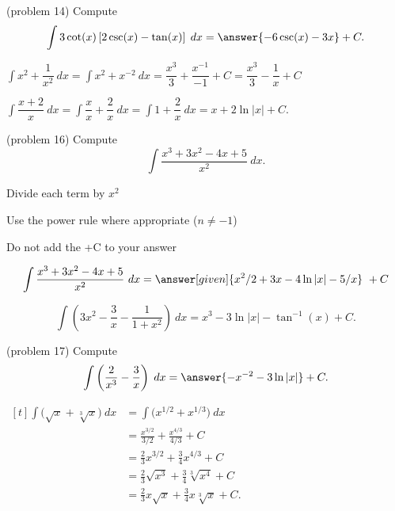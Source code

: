 \documentclass{ximera}
\begin{document}
\begin{problem}(problem 14)
Compute
\[
\int 3\cot(x)\left[2\csc(x) - \tan(x)\right]\; dx = \answer{-6\csc(x) - 3x} + C.
\]
\end{problem}



\begin{example}[example 15]
$\int x^2 + \dfrac{1}{x^2} \ dx = \int x^2 + x^{-2} \ dx = \dfrac{x^3}{3} + \dfrac{x^{-1}}{-1} + C 
= \dfrac{x^3}{3} - \dfrac{1}{x} + C$
\end{example}


\begin{example}[example 16]
$\int \dfrac{x+2}{x} \ dx = \int \dfrac{x}{x} + \dfrac{2}{x} \ dx = \int 1 + \dfrac{2}{x} \ dx = x + 2\ln|x| +C.$
\end{example}


\begin{problem}(problem 16)
Compute
\[
\int \dfrac{x^3 + 3x^2 - 4x + 5}{x^2} \ dx.
\]

\begin{hint}
Divide each term by $x^2$
\end{hint}
\begin{hint}
Use the power rule where appropriate ($n\neq -1$)
\end{hint}
\begin{hint}
\begin{center}
Do not add the +C to your answer
\end{center}
\end{hint}

\[
\int  \dfrac{x^3 + 3x^2 - 4x + 5}{x^2} \ dx =
\answer[given]{x^2 /2 + 3x - 4\ln|x| -5/x} \ +  C
\]
\end{problem}



\begin{example}[example 17]
\[
\int \left(3x^2 - \dfrac{3}{x} - \dfrac{1}{1+x^2}\right) \ dx = x^3 - 3\ln|x| - \tan^{-1}(x) + C.
\]
\end{example}


\begin{problem}(problem 17)
Compute
\[
\int \left(\frac{2}{x^3} - \frac{3}{x} \right) \; dx = \answer{-x^{-2} -3\ln|x|} + C.
\]
\end{problem}

\begin{example}[example 18]
$\begin{aligned}[t]
\int \big(\sqrt x + \sqrt[3] x \big) \ dx &= \int \big(x^{1/2} + x^{1/3}\big) \ dx \\
&= \frac{x^{3/2}}{3/2} + \frac{x^{4/3}}{4/3} + C \\
&= \tfrac{2}{3} x^{3/2} + \tfrac{3}{4} x^{4/3} + C \\
&= \tfrac{2}{3} \sqrt {x^3} + \tfrac{3}{4}  \sqrt[3] {x^4} + C \\
&= \tfrac{2}{3} x\sqrt x + \tfrac{3}{4} x \sqrt[3] x + C.
\end{aligned}$
\end{example}
\end{document}
